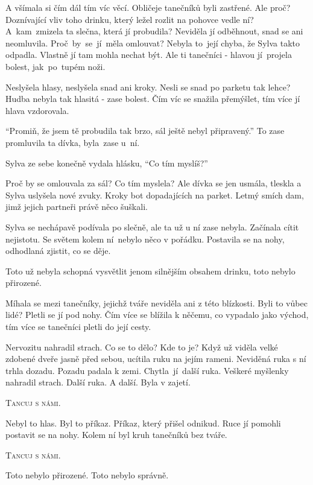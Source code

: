 \documentclass[10pt]{article}
\begin{document}
\begin{spacing}{1}
	A všímala si čím dál tím víc věcí.
	Obličeje tanečníků byli zastřené.
	Ale proč?
	Doznívající vliv toho drinku, který ležel rozlit na pohovce vedle ní?
	A~kam~zmizela ta slečna, která jí probudila?
	Neviděla jí odběhnout, snad se ani neomluvila.
	Proč~by~se~jí~měla omlouvat?
	Nebyla to~její chyba, že Sylva takto odpadla.
	Vlastně jí tam mohla nechat být.
	Ale ti tanečníci - hlavou jí~projela bolest, jak~po~tupém noži.\par
	Neslyšela hlasy, neslyšela snad ani kroky.
	Nesli se snad po parketu tak lehce?
	Hudba nebyla tak hlasitá - zase bolest.
	Čím víc se snažila přemýšlet, tím více jí hlava vzdorovala.\par
	\enquote{Promiň, že jsem tě probudila tak brzo, sál ještě nebyl připravený.}
	To zase promluvila ta dívka, byla~zase u~ní.\par
	Sylva ze sebe konečně vydala hlásku, \enquote{Co tím myslíš?}\par
	Proč by se omlouvala za sál?
	Co tím myslela?
	Ale dívka se jen usmála, tleskla a Sylva uslyšela nové zvuky.
	Kroky bot dopadajících na parket.
	Letmý smích dam, jimž jejich partneři právě něco šuškali.\par
	Sylva se nechápavě podívala po slečně, ale ta už u ní zase nebyla.
	Začínala cítit nejistotu.
	Se světem kolem ní~nebylo něco v pořádku.
	Postavila se na nohy, odhodlaná zjistit, co se děje.\par
	Toto už nebyla schopná vysvětlit jenom silnějším obsahem drinku,
	toto nebylo přirozené.\par
	Míhala se mezi tanečníky, jejichž tváře neviděla ani z této blízkosti.
	Byli to vůbec lidé?
	Pletli se jí pod nohy.
	Čím více se blížila k něčemu, co vypadalo jako východ,
	tím více se tanečníci pletli do její cesty.\par
	Nervozitu nahradil strach.
	Co se to dělo?
	Kde to je?
	Když už viděla velké zdobené dveře jasně před sebou, ucítila ruku na jejím rameni.
	Neviděná ruka s ní trhla dozadu.
	Pozadu padala k zemi.
	Chytla~jí~další ruka.
	Veškeré myšlenky nahradil strach.
	Další ruka.
	A další.
	Byla v zajetí.\par
	\textsc{Tancuj s námi.}\par
	Nebyl to hlas.
	Byl to příkaz.
	Příkaz, který přišel odnikud.
	Ruce jí pomohli postavit se na nohy.
	Kolem ní byl kruh tanečníků bez tváře.\par
	\textsc{Tancuj s námi.}\par
	Toto nebylo přirozené.
	Toto nebylo správně.\par

\end{spacing}
\end{document}
